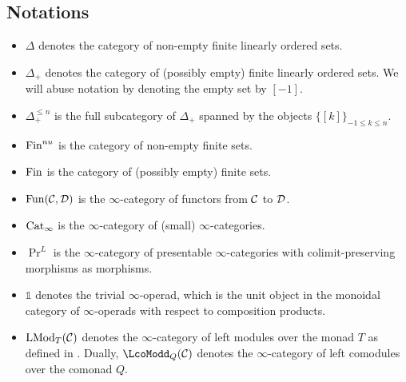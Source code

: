 \subsection{Notations}
\begin{itemize}
	\item $\Delta$ denotes the category of non-empty finite linearly ordered sets.
	\item $\Delta_{+}$ denotes the category of (possibly empty) finite linearly ordered sets. We will abuse notation by denoting the empty set by $[-1]$.
	\item $\Delta^{\leq n}_{+}$ is the full subcategory of $\Delta_{+}$ spanned by the objects $\{[k]\}_{-1\leq k\leq n}$.
	\item $\operatorname{Fin}^{nu}$ is the category of non-empty finite sets.
	\item $\operatorname{Fin}$ is the category of (possibly empty) finite sets. 
	\item $\operatorname{Fun}({\mathcal{C}},{\mathcal{D}})$ is the $\infty$-category of functors from ${\mathcal{C}}$ to ${\mathcal{D}}$.
	\item $\operatorname{Cat}_{\infty}$ is the $\infty$-category of (small) $\infty$-categories.
	\item $\Pr^{L}$ is the $\infty$-category of presentable $\infty$-categories with colimit-preserving morphisms as morphisms.
	\item $\mathds{1}$ denotes the trivial $\infty$-operad, which is the unit object in the monoidal category of $\infty$-operads with respect to composition
	products.
	\item $\operatorname{LMod}_{T}({\mathcal{C}})$ denotes the $\infty$-category of left modules over the monad $T$ as defined in \cite[Section 4.2]{HA}. Dually, $\LcoModd_{Q}(\CC)$ denotes the $\infty$-category of left comodules over the comonad $Q$.
\end{itemize}